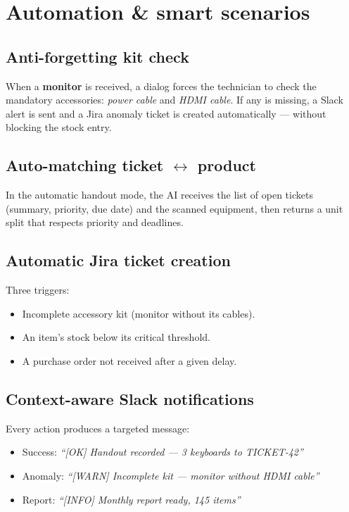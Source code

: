 \documentclass[11pt,a4paper]{article}
\begin{document}
\section{Automation \& smart scenarios}

\subsection{Anti-forgetting kit check}
When a \textbf{monitor} is received, a dialog forces the technician
to check the mandatory accessories: \emph{power cable} and
\emph{HDMI cable}. If any is missing, a Slack alert is sent and a
Jira anomaly ticket is created automatically — without blocking the
stock entry.

\subsection{Auto-matching ticket $\leftrightarrow$ product}
In the automatic handout mode, the AI receives the list of open
tickets (summary, priority, due date) and the scanned equipment,
then returns a unit split that respects priority and deadlines.

\subsection{Automatic Jira ticket creation}
Three triggers:
\begin{itemize}
  \item Incomplete accessory kit (monitor without its cables).
  \item An item's stock below its critical threshold.
  \item A purchase order not received after a given delay.
\end{itemize}

\subsection{Context-aware Slack notifications}
Every action produces a targeted message:
\begin{itemize}
  \item Success: \emph{``[OK] Handout recorded — 3 keyboards to TICKET-42''}
  \item Anomaly: \emph{``[WARN] Incomplete kit — monitor without HDMI cable''}
  \item Report: \emph{``[INFO] Monthly report ready, 145 items''}
\end{itemize}
\end{document}
